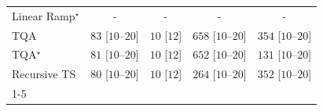 \begin{tabular}{l|cccc|}
Linear Ramp$^\star$ & {\cellcolor[HTML]{000000}} \color[HTML]{F1F1F1} {\cellcolor{white}} \color{black} - & {\cellcolor[HTML]{000000}} \color[HTML]{F1F1F1} {\cellcolor{white}} \color{black} - & {\cellcolor[HTML]{000000}} \color[HTML]{F1F1F1} {\cellcolor{white}} \color{black} - & {\cellcolor[HTML]{000000}} \color[HTML]{F1F1F1} {\cellcolor{white}} \color{black} - \\
TQA & {\cellcolor[HTML]{E7F6E3}} \color[HTML]{000000} $83$ [$10$--$20$] & {\cellcolor[HTML]{F7FCF5}} \color[HTML]{000000} $10$ [$12$] & {\cellcolor[HTML]{004A1E}} \color[HTML]{F1F1F1} $658$ [$10$--$20$] & {\cellcolor[HTML]{6DC072}} \color[HTML]{000000} $354$ [$10$--$20$] \\
TQA$^\star$ & {\cellcolor[HTML]{E8F6E3}} \color[HTML]{000000} $81$ [$10$--$20$] & {\cellcolor[HTML]{F7FCF5}} \color[HTML]{000000} $10$ [$12$] & {\cellcolor[HTML]{004E1F}} \color[HTML]{F1F1F1} $652$ [$10$--$20$] & {\cellcolor[HTML]{D8F0D2}} \color[HTML]{000000} $131$ [$10$--$20$] \\
Recursive TS & {\cellcolor[HTML]{E8F6E3}} \color[HTML]{000000} $80$ [$10$--$20$] & {\cellcolor[HTML]{F7FCF5}} \color[HTML]{000000} $10$ [$12$] & {\cellcolor[HTML]{9ED798}} \color[HTML]{000000} $264$ [$10$--$20$] & {\cellcolor[HTML]{6DC072}} \color[HTML]{000000} $352$ [$10$--$20$] \\
\cline{1-5}
\bottomrule
\end{tabular}
